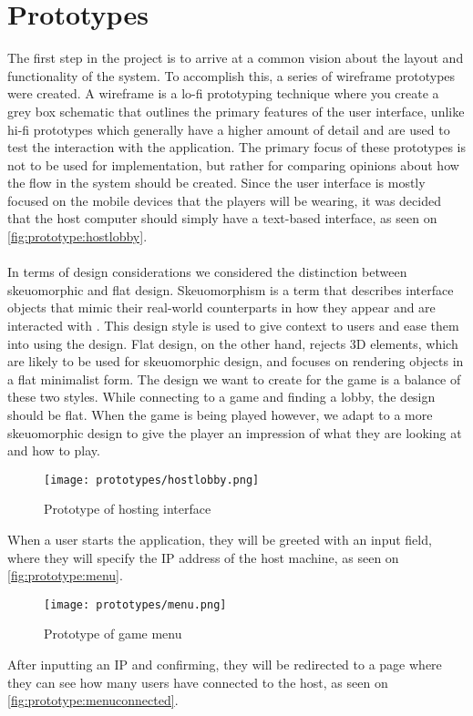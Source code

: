 \section{Prototypes}\label{sec:sprint1-prototypes}
The first step in the project is to arrive at a common vision about the layout and functionality of the system.
To accomplish this, a series of wireframe prototypes were created.
A wireframe is a lo-fi prototyping technique where you create a grey box schematic that outlines the primary features of the user interface, unlike hi-fi prototypes which generally have a higher amount of detail and are used to test the interaction with the application.
The primary focus of these prototypes is not to be used for implementation, but rather for comparing opinions about how the flow in the system should be created.
Since the user interface is mostly focused on the mobile devices that the players will be wearing, it was decided that the host computer should simply have a text-based interface, as seen on \autoref{fig:prototype:hostlobby}.
\\\\
In terms of design considerations we considered the distinction between skeuomorphic and flat design.
Skeuomorphism is a term that describes interface objects that mimic their real-world counterparts in how they appear and are interacted with \cite{skeuomorphism}.
This design style is used to give context to users and ease them into using the design.
Flat design, on the other hand, rejects 3D elements, which are likely to be used for skeuomorphic design, and focuses on rendering objects in a flat minimalist form.
The design we want to create for the game is a balance of these two styles.
While connecting to a game and finding a lobby, the design should be flat.
When the game is being played however, we adapt to a more skeuomorphic design to give the player an impression of what they are looking at and how to play.


\begin{figure}[H]
    \centering
    \texttt{[image: prototypes/hostlobby.png]}
    \caption{Prototype of hosting interface}
    \label{fig:prototype:hostlobby}
\end{figure}
\noindent
When a user starts the application, they will be greeted with an input field, where they will specify the IP address of the host machine, as seen on \autoref{fig:prototype:menu}. 

\begin{figure}[H]
    \centering
    \texttt{[image: prototypes/menu.png]}
    \caption{Prototype of game menu}
    \label{fig:prototype:menu}
\end{figure}
\noindent
After inputting an IP and confirming, they will be redirected to a page where they can see how many users have connected to the host, as seen on \autoref{fig:prototype:menuconnected}. 

